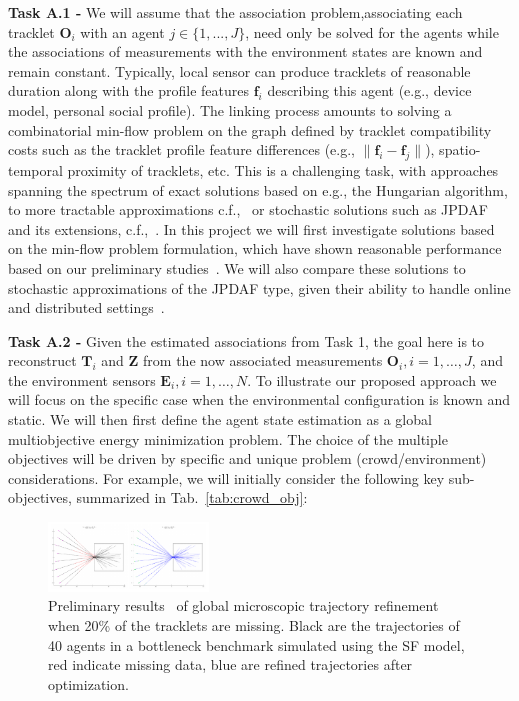 {\bf Task A.1 -}  We will assume that the association problem,associating each tracklet $\mathbf{O}_i$ with an agent $j \in \{ 1, ... , J \}$, need only be solved for the agents while the associations of measurements with the environment states are known and remain constant.    Typically, local sensor can produce tracklets of reasonable duration along with the profile features $\mathbf{f}_i$ describing this agent (e.g., device model, personal social profile). The linking process amounts to solving a combinatorial min-flow problem on the graph defined by tracklet compatibility costs such as the tracklet profile feature differences (e.g., $\|\mathbf{f}_i - \mathbf{f}_j\|$), spatio-temporal proximity of tracklets, etc. This is a challenging task, with approaches spanning the spectrum of exact solutions based on e.g., the Hungarian algorithm, to more tractable approximations c.f.,~\cite{tron2011b,wang2013,mazzon2013,alahi2014socially} or stochastic solutions such as JPDAF and its extensions, c.f.,~\cite{fortmann1980multi,schulz2003people}.  In this project we will first investigate solutions based on the min-flow problem formulation, which have shown reasonable performance based on our preliminary studies~\cite{yoon2016}.  We will also compare these solutions to stochastic approximations of the JPDAF type, given their ability to handle online and distributed settings~\cite{kamal2013information}.

{\bf Task A.2 -}  Given the estimated associations from Task 1, the goal here is to reconstruct $\mathbf{T}_{i}$ and $\mathbf{Z}$ from the now associated measurements $\mathbf{O}_i, i=1,\ldots,J$, and the environment sensors $\mathbf{E}_i, i=1,\ldots,N$. To illustrate our proposed approach we will focus on the specific case when the environmental configuration is known and static.  We will then first define the agent state estimation as a global multiobjective energy minimization problem.  The choice of the multiple objectives will be driven by specific and unique problem (crowd/environment) considerations.  For example, we will initially consider the following key sub-objectives, summarized in Tab.~\ref{tab:crowd_obj}:


\begin{figure}
\vspace{-20pt}
\includegraphics[width=0.38\textwidth]{wacv16_bottleneck.pdf}
\vspace{-10pt}
\caption{\small Preliminary results~\cite{yoon2016} of global microscopic trajectory refinement when 20\% of the tracklets are missing.  Black are the trajectories of 40 agents in a bottleneck benchmark simulated using the SF model, red indicate missing data, blue are refined trajectories after optimization.}
\vspace{-15pt}
\label{fig:bottleneck}
\end{figure}

